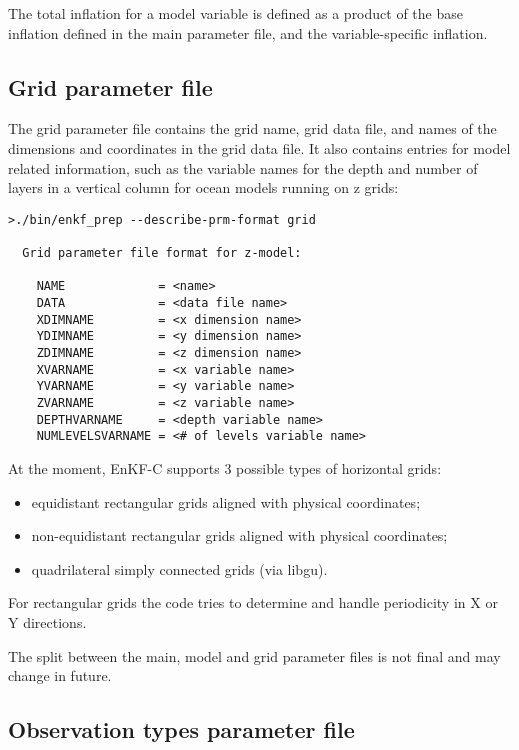 \documentclass[11pt]{report}
\begin{document}
The total inflation for a model variable is defined as a product of the base inflation defined in the main parameter file, and the variable-specific inflation.

\subsection{Grid parameter file}

The grid parameter file contains the grid name, grid data file, and names of the dimensions and coordinates in the grid data file.
It also contains entries for model related information, such as the variable names for the depth and number of layers in a vertical column for ocean models running on z grids:
\begin{Verbatim}[frame=single,fontsize=\footnotesize]
>./bin/enkf_prep --describe-prm-format grid

  Grid parameter file format for z-model:

    NAME             = <name>
    DATA             = <data file name>
    XDIMNAME         = <x dimension name>
    YDIMNAME         = <y dimension name>
    ZDIMNAME         = <z dimension name>
    XVARNAME         = <x variable name>
    YVARNAME         = <y variable name>
    ZVARNAME         = <z variable name>
    DEPTHVARNAME     = <depth variable name>
    NUMLEVELSVARNAME = <# of levels variable name>
\end{Verbatim}

At the moment, EnKF-C supports 3 possible types of horizontal grids:
\begin{itemize}
\item equidistant rectangular grids aligned with physical coordinates;
\item non-equidistant rectangular grids aligned with physical coordinates;
\item quadrilateral simply connected grids (via libgu).
\end{itemize}
For rectangular grids the code tries to determine and handle periodicity in X or Y directions.

The split between the main, model and grid parameter files is not final and may change in future.

\subsection{Observation types parameter file}
\label{sec:obstypesprm}
\end{document}
